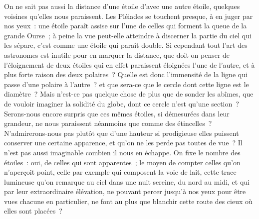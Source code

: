 \documentclass[french,twoside]{book} %
\begin{document}
On ne sait pas aussi la distance d’une étoile d’avec une autre étoile, quelques voisines qu’elles nous paraissent. Les Pléiades se touchent presque, à en juger par nos yeux : une étoile paraît assise sur l’une de celles qui forment la queue de la grande Ourse ; à peine la vue peut-elle atteindre à discerner la partie du ciel qui les sépare, c’est comme une étoile qui paraît double. Si cependant tout l’art des astronomes est inutile pour en marquer la distance, que doit-on penser de l’éloignement de deux étoiles qui en effet paraissent éloignées l’une de l’autre, et à plus forte raison des deux polaires ? Quelle est donc l’immensité de la ligne qui passe d’une polaire à l’autre ? et que sera-ce que le cercle dont cette ligne est le diamètre ? Mais n’est-ce pas quelque chose de plus que de sonder les abîmes, que de vouloir imaginer la solidité du globe, dont ce cercle n’est qu’une section ? Serons-nous encore surpris que ces mêmes étoiles, si démesurées dans leur grandeur, ne nous paraissent néanmoins que comme des étincelles ? N'admirerons-nous pas plutôt que d’une hauteur si prodigieuse elles puissent conserver une certaine apparence, et qu’on ne les perde pas toutes de vue ? Il n’est pas aussi imaginable combien il nous en échappe. On fixe le nombre des étoiles : oui, de celles qui sont apparentes ; le moyen de compter celles qu’on n’aperçoit point, celle par exemple qui composent la voie de lait, cette trace lumineuse qu’on remarque au ciel dans une nuit sereine, du nord au midi, et qui par leur extraordinaire élévation, ne pouvant percer jusqu’à nos yeux pour être vues chacune en particulier, ne font au plus que blanchir cette route des cieux où elles sont placées ?\par
\end{document}
